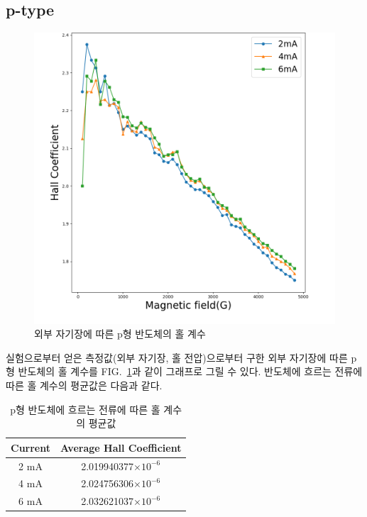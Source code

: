 \documentclass[aps,reprint,superscriptaddress,10pt]{revtex4-2}
\begin{document}
\subsection{p-type}
\begin{figure}[htbp]
  \centering
  \includegraphics[scale = 0.3]{co_p.png}
  \caption{외부 자기장에 따른 p형 반도체의 홀 계수}\label{fig:co_p}
\end{figure}
실험으로부터 얻은 측정값(외부 자기장, 홀 전압)으로부터 구한 외부 자기장에 따른 
p형 반도체의 홀 계수를 FIG.~\ref{fig:co_p}과 같이 그래프로 그릴 수 있다. 반도체에 흐르는
전류에 따른 홀 계수의 평균값은 다음과 같다.
  \begin{table}[htbp]
    \centering
    \begin{tabular}{ c|c } 
      \hline
      \hline
      Current & Average Hall Coefficient \\
      \hline
      2 mA & 2.019940377$\times 10^{-6}$ \\ 
      
      4 mA & 2.024756306$\times 10^{-6}$ \\ 
      
      6 mA & 2.032621037$\times 10^{-6}$ \\ 
      \hline
      \hline
    \end{tabular}
    \caption{p형 반도체에 흐르는 전류에 따른 홀 계수의 평균값}
    \end{table}
\end{document}
